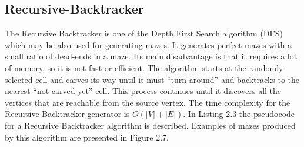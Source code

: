 \subsection{Recursive-Backtracker}
The Recursive Backtracker is one of the Depth First Search algorithm (DFS) which may be also used for generating mazes. It generates perfect mazes with a
small ratio of dead-ends in a maze. Its main disadvantage is that it requires a lot of memory, so it is not fast or efficient\cite{18}.
The algorithm starts at the randomly selected cell and carves its way until it must “turn around” and backtracks to the nearest “not carved yet” cell.
This process continues until it discovers all the vertices that are reachable from the source vertex. The time complexity for the Recursive-Backtracker
generator is $O(|V|+|E|)$. In Listing 2.3 the pseudocode for a Recursive Backtracker algorithm is described. Examples of mazes produced by this algorithm
are presented in Figure 2.7.

